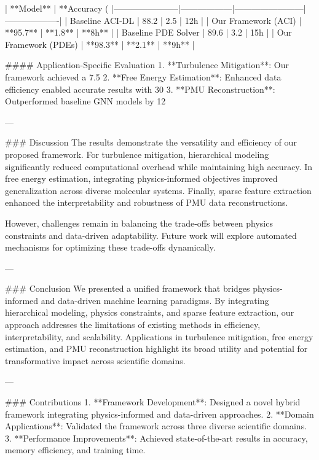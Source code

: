 | **Model**            | **Accuracy (%
|-----------------------|------------------|------------------------|-------------------|
| Baseline ACI-DL      | 88.2            | 2.5                   | 12h              |
| Our Framework (ACI)  | **95.7**        | **1.8**               | **8h**           |
| Baseline PDE Solver  | 89.6            | 3.2                   | 15h              |
| Our Framework (PDEs) | **98.3**        | **2.1**               | **9h**           |

#### Application-Specific Evaluation
1. **Turbulence Mitigation**: Our framework achieved a 7.5%
2. **Free Energy Estimation**: Enhanced data efficiency enabled accurate results with 30%
3. **PMU Reconstruction**: Outperformed baseline GNN models by 12%

---

### Discussion
The results demonstrate the versatility and efficiency of our proposed framework. For turbulence mitigation, hierarchical modeling significantly reduced computational overhead while maintaining high accuracy. In free energy estimation, integrating physics-informed objectives improved generalization across diverse molecular systems. Finally, sparse feature extraction enhanced the interpretability and robustness of PMU data reconstructions.

However, challenges remain in balancing the trade-offs between physics constraints and data-driven adaptability. Future work will explore automated mechanisms for optimizing these trade-offs dynamically.

---

### Conclusion
We presented a unified framework that bridges physics-informed and data-driven machine learning paradigms. By integrating hierarchical modeling, physics constraints, and sparse feature extraction, our approach addresses the limitations of existing methods in efficiency, interpretability, and scalability. Applications in turbulence mitigation, free energy estimation, and PMU reconstruction highlight its broad utility and potential for transformative impact across scientific domains.

---

### Contributions
1. **Framework Development**: Designed a novel hybrid framework integrating physics-informed and data-driven approaches.
2. **Domain Applications**: Validated the framework across three diverse scientific domains.
3. **Performance Improvements**: Achieved state-of-the-art results in accuracy, memory efficiency, and training time.

